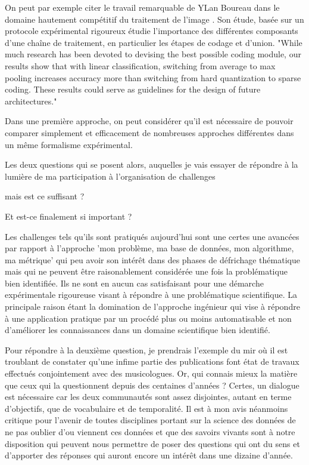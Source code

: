 On peut par exemple citer le travail remarquable de YLan Boureau dans le domaine hautement compétitif du traitement de l'image \cite{boureau2010learning}. Son étude, basée sur un protocole expérimental rigoureux étudie l'importance des différentes composants d'une chaîne de traitement, en particulier les étapes de codage et d'union. "While much research has been devoted to devising
the best possible coding module, our results show that with
linear classification, switching from average to max pooling
increases accuracy more than switching from hard quantization to sparse coding. These results could serve as guidelines for the design of future architectures."

Dans une première approche, on peut considérer qu'il est nécessaire de pouvoir comparer simplement et efficacement de nombreuses approches différentes dans un même formalisme expérimental.

Les deux questions qui se posent alors, auquelles je vais essayer de répondre à la lumière de ma participation à l'organisation de challenges

 mais est ce suffisant ?

Et est-ce finalement si important ?



Les challenges tels qu'ils sont pratiqués aujourd'hui sont une certes une avancées par rapport à l'approche 'mon problème, ma base de données, mon algorithme, ma métrique' qui peu avoir son intérêt dans des phases de défrichage thématique mais qui ne peuvent être raisonablement considérée une fois la problématique bien identifiée. Ils  ne sont en aucun cas satisfaisant pour une démarche expérimentale rigoureuse visant à répondre à une problématique scientifique. La principale raison étant la domination de l'approche \og ingénieur \fg qui vise à répondre à une application pratique par un procédé plus ou moins automatisable et non d'améliorer les connaissances dans un domaine scientifique bien identifié.


Pour répondre à la deuxième question, je prendrais l'exemple du mir où il est troublant de constater qu'une infime partie des publications font état de travaux effectués conjointement avec des musicologues. Or, qui connais mieux la matière que ceux qui la questionnent depuis des centaines d'années ? Certes, un dialogue est nécessaire car les deux communautés sont assez disjointes, autant en terme d'objectifs, que de vocabulaire et de temporalité. Il est à mon avis néanmoins critique pour l'avenir de toutes disciplines portant sur la science des données de ne pas oublier d'ou viennent ces données et que des savoirs vivants sont à notre disposition qui peuvent nous permettre de poser des questions qui ont du sens et d'apporter des réponses qui auront encore un intérêt dans une dizaine d'année.

